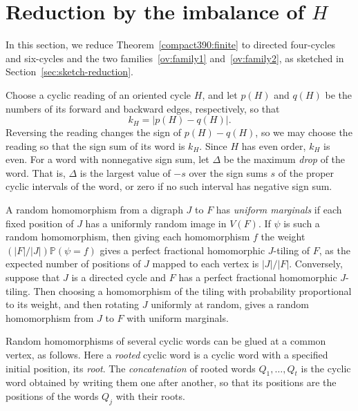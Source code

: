 \section{Reduction by the imbalance of \texorpdfstring{$H$}{H}}\label{compact390:structural-section}
In this section, we reduce Theorem~\ref{compact390:finite} to directed four-cycles and six-cycles and the two families~\ref{ov:family1} and~\ref{ov:family2}, as sketched in Section~\ref{sec:sketch-reduction}.

Choose a cyclic reading of an oriented cycle $H$, and let $p(H)$ and
$q(H)$ be the numbers of its forward and backward edges, respectively, so that
\[
                 k_H=|p(H)-q(H)|.
\]
Reversing the reading changes the sign of $p(H)-q(H)$, so we may choose the reading so that the sign sum of its word is $k_H$. Since $H$ has even order, $k_H$ is even.
For a word with nonnegative sign sum, let $\Delta$ be the maximum \emph{drop} of the word. That is, $\Delta$ is the largest value of $-s$ over the sign sums $s$ of the proper cyclic intervals of the word, or zero if no such interval has negative sign sum.

A random homomorphism from a digraph $J$ to $F$ has \emph{uniform marginals} if
each fixed position of $J$ has a uniformly random image in $V(F)$.
If $\psi$ is such a random homomorphism, then giving each homomorphism $f$ the weight $(|F|/|J|)\mathbb P(\psi=f)$ gives a perfect fractional homomorphic $J$-tiling of $F$, as the expected number of positions of $J$ mapped to each vertex is $|J|/|F|$.
Conversely, suppose that $J$ is a directed cycle and $F$ has a perfect fractional homomorphic $J$-tiling. Then choosing a homomorphism of the tiling with probability proportional to its weight, and then rotating $J$ uniformly at random, gives a random homomorphism from $J$ to $F$ with uniform marginals.

Random homomorphisms of several cyclic words can be glued at a common vertex, as follows. Here a \emph{rooted} cyclic word is a cyclic word with a specified initial position, its \emph{root}. The \emph{concatenation} of rooted words $Q_1,\ldots,Q_t$ is the cyclic word obtained by writing them one after another, so that its positions are the positions of the words $Q_j$ with their roots.

